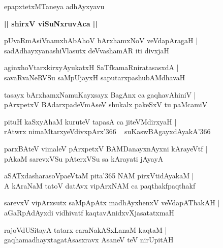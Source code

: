 \documentclass[twoside,12pt,openright]{book}
\newcounter{shloka}[chapter]
\def\uvaca#1{\centerline{{\large\textbf{#1}}}}
\begin{document}
\begin{center}
epapxtetxMTaneya adhAyxyavu
\end{center}

\uvaca{|| shirxV viSuNxruvAca ||}

\begin{shloka}%
pUvaRmAsiVnamxhAbAhoV bArxhamxNoV veVdapAragaH |\\
sadAdhayxyanashiVlasutx deVvashamAR iti divxjaH 
\end{shloka}

\begin{shloka}%
aginxhoVtarxkirxyAyukatxH SaTfkamaRniratasasxdA |\\
savaRvaNeRVSu saMpUjayxH saputarxpashubAMdhavaH 
\end{shloka}

\begin{shloka}%
tasayx bArxhamxNamuKayxsayx BagAnx ca gaqhavAhiniV |\\
pArxpetxV BAdarxpadeVmAseV shukalx pakeSxV tu paMcamiV 
\end{shloka}

\begin{shloka}%
pituH kaSxyAhaM kuruteV tapasA ca jiteVMdirxyaH |\\
rAtwrx nimaMtarxyeVdivxpArx\char'366 ~ suKaswBAgayxdAyakA\char'366 
\end{shloka}

\begin{shloka}%
parxBAteV vimaleV pArxpetxV BAMDanayxnAyxni kArayeVtf |\\
pAkaM sarevxVSu pAterxVSu sa kArayati jAyayA 
\end{shloka}

\begin{shloka}%
aSATxdasharasoVpaeVtaM pita\char'365 NAM pirxVtidAyakaM |\\
A kAraNaM tatoV datAvx vipArxNAM ca paqthakfpaqthakf
\end{shloka}

\begin{shloka}%
sarevxV vipArxsutx saMpApAtx madhAyxhenxV veVdapAThakAH |\\
aGaRpAdAyxdi vidhivatf kaqtavAnidxvXjasatatxmaH 
\end{shloka}

\begin{shloka}%
rajoVdUSitayA tatarx caraNakASxLanaM kaqtaM |\\
gaqhamadhayxtagatAsasxravx AsaneV teV nirUpitAH 
\end{shloka}
\end{document}
